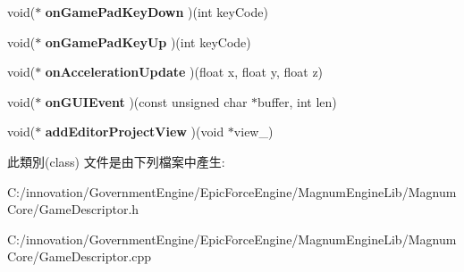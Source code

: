 \begin{DoxyCompactItemize}
\item 
void($\ast$ {\bfseries on\+Game\+Pad\+Key\+Down} )(int key\+Code)\hypertarget{class_i_dream_sky_1_1_game_descriptor_afd3fff3c999110b189c0e1018b8b5398}{}\label{class_i_dream_sky_1_1_game_descriptor_afd3fff3c999110b189c0e1018b8b5398}

\item 
void($\ast$ {\bfseries on\+Game\+Pad\+Key\+Up} )(int key\+Code)\hypertarget{class_i_dream_sky_1_1_game_descriptor_a8c1d427bcae4ee9d33c896bdc73acc0f}{}\label{class_i_dream_sky_1_1_game_descriptor_a8c1d427bcae4ee9d33c896bdc73acc0f}

\item 
void($\ast$ {\bfseries on\+Acceleration\+Update} )(float x, float y, float z)\hypertarget{class_i_dream_sky_1_1_game_descriptor_a127d9f9a85384b7b6d5cd417d44be27e}{}\label{class_i_dream_sky_1_1_game_descriptor_a127d9f9a85384b7b6d5cd417d44be27e}

\item 
void($\ast$ {\bfseries on\+G\+U\+I\+Event} )(const unsigned char $\ast$buffer, int len)\hypertarget{class_i_dream_sky_1_1_game_descriptor_ae014576cd96f93db59ebcf17ca28ab0a}{}\label{class_i_dream_sky_1_1_game_descriptor_ae014576cd96f93db59ebcf17ca28ab0a}

\item 
void($\ast$ {\bfseries add\+Editor\+Project\+View} )(void $\ast$view\+\_\+)\hypertarget{class_i_dream_sky_1_1_game_descriptor_ac17495fc782d686904f0a8efbd9a8111}{}\label{class_i_dream_sky_1_1_game_descriptor_ac17495fc782d686904f0a8efbd9a8111}

\end{DoxyCompactItemize}


此類別(class) 文件是由下列檔案中產生\+:\begin{DoxyCompactItemize}
\item 
C\+:/innovation/\+Government\+Engine/\+Epic\+Force\+Engine/\+Magnum\+Engine\+Lib/\+Magnum\+Core/Game\+Descriptor.\+h\item 
C\+:/innovation/\+Government\+Engine/\+Epic\+Force\+Engine/\+Magnum\+Engine\+Lib/\+Magnum\+Core/Game\+Descriptor.\+cpp\end{DoxyCompactItemize}
